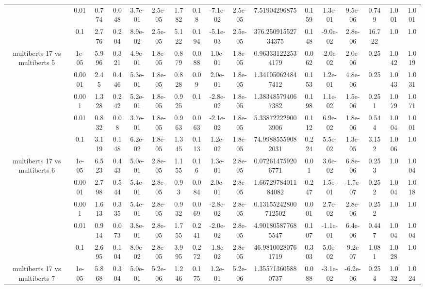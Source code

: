 \begin{tabular}{|c|c|c|c|c|c|c|c|c|c|c|c|c|c|c|c|c|}
 & 0.01 & 0.774 & 0.048 & 3.7e-01 & 2.5e-05 & 1.782 & 0.18 & -7.1e-02 & 2.5e-05 & 7.51904296875 & 0.159 & 1.3e-01 & 9.5e-06 & 0.749 & 1.001 & 1.001 \\
 & 0.1 & 2.776 & 0.204 & 8.9e-02 & 2.5e-05 & 5.122 & 0.194 & -5.1e-03 & 2.5e-05 & 376.25091552734375 & 0.148 & -9.0e-02 & 2.8e-06 & 16.722 & 1.0 & 1.0 \\
\hline
\multirow{5}{*}{multiberts 17 vs multiberts 5} & 1e-05 & 5.996 & 0.321 & 4.9e-01 & 1.8e-05 & 0.879 & 0.088 & 1.0e-01 & 1.8e-05 & 0.963331222534179 & 0.062 & -2.0e-02 & 2.0e-06 & 0.25 & 1.042 & 1.019 \\
 & 0.0001 & 2.45 & 0.446 & 5.3e-01 & 1.8e-05 & 0.828 & 0.09 & 2.0e-01 & 1.8e-05 & 1.341050624847412 & 0.153 & 1.2e-01 & 4.8e-06 & 0.25 & 1.043 & 1.031 \\
 & 0.001 & 1.328 & 0.242 & 5.2e-01 & 1.8e-05 & 0.925 & 0.1 & -2.8e-02 & 1.8e-05 & 1.383485794067382 & 0.198 & 1.1e-02 & 1.5e-06 & 0.251 & 1.079 & 1.071 \\
 & 0.01 & 0.832 & 0.08 & 3.7e-01 & 1.8e-05 & 0.963 & 0.063 & -2.1e-02 & 1.8e-05 & 5.338722229003906 & 0.112 & 6.9e-02 & 1.8e-06 & 0.544 & 1.004 & 1.001 \\
 & 0.1 & 3.119 & 0.148 & 6.2e-02 & 1.8e-05 & 1.345 & 0.113 & 1.2e-02 & 1.8e-05 & 74.99885559082031 & 0.224 & 5.5e-02 & 1.3e-05 & 3.152 & 1.006 & 1.0 \\
\hline
\multirow{5}{*}{multiberts 17 vs multiberts 6} & 1e-05 & 6.523 & 0.443 & 5.0e-01 & 2.8e-05 & 1.155 & 0.16 & 1.3e-01 & 2.8e-05 & 0.072614759206771 & 0.01 & 3.6e-02 & 6.8e-06 & 0.253 & 1.0 & 1.004 \\
 & 0.0001 & 2.798 & 0.544 & 5.4e-01 & 2.8e-05 & 0.93 & 0.084 & 2.0e-01 & 2.8e-05 & 1.6672978401184082 & 0.247 & 1.5e-01 & -1.7e-07 & 0.252 & 1.004 & 1.018 \\
 & 0.001 & 1.613 & 0.335 & 5.4e-01 & 2.8e-05 & 0.932 & 0.069 & -2.8e-02 & 2.8e-05 & 0.13155242800712502 & 0.001 & 2.7e-02 & 2.8e-06 & 0.252 & 1.0 & 1.0 \\
 & 0.01 & 0.914 & 0.073 & 3.8e-01 & 2.8e-05 & 1.755 & 0.241 & -2.0e-02 & 2.8e-05 & 4.901805877685547 & 0.107 & -1.1e-01 & 6.4e-06 & 0.447 & 1.004 & 1.004 \\
 & 0.1 & 2.695 & 0.104 & 8.0e-02 & 2.8e-05 & 3.995 & 0.272 & -1.8e-02 & 2.8e-05 & 46.98100280761719 & 0.303 & 5.0e-02 & -9.2e-07 & 1.081 & 1.028 & 1.0 \\
\hline
\multirow{5}{*}{multiberts 17 vs multiberts 7} & 1e-05 & 5.868 & 0.304 & 5.0e-01 & 5.2e-06 & 1.246 & 0.175 & 1.2e-01 & 5.2e-06 & 1.355713605880737 & 0.088 & -3.1e-02 & -6.2e-06 & 0.254 & 1.032 & 1.024 \\

\end{tabular}
